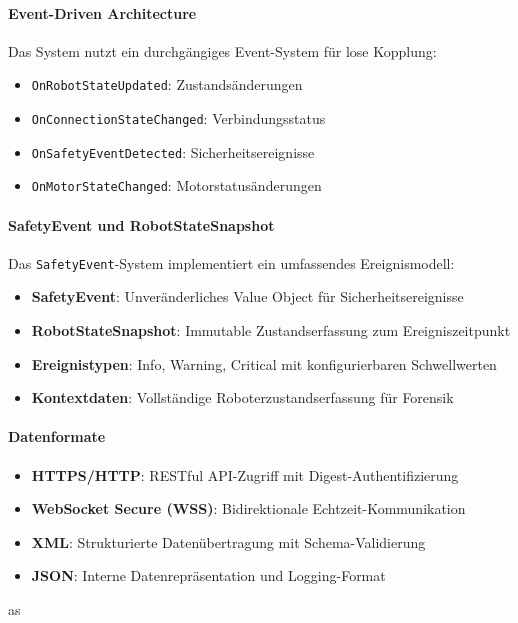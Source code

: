 
\paragraph{Event-Driven Architecture}
Das System nutzt ein durchgängiges Event-System für lose Kopplung:
\begin{itemize}
	\item \texttt{OnRobotStateUpdated}: Zustandsänderungen
	\item \texttt{OnConnectionStateChanged}: Verbindungsstatus
	\item \texttt{OnSafetyEventDetected}: Sicherheitsereignisse
	\item \texttt{OnMotorStateChanged}: Motorstatusänderungen
\end{itemize}

\paragraph{SafetyEvent und RobotStateSnapshot}
Das \texttt{SafetyEvent}-System implementiert ein umfassendes Ereignismodell:
\begin{itemize}
	\item \textbf{SafetyEvent}: Unveränderliches Value Object für Sicherheitsereignisse
	\item \textbf{RobotStateSnapshot}: Immutable Zustandserfassung zum Ereigniszeitpunkt
	\item \textbf{Ereignistypen}: Info, Warning, Critical mit konfigurierbaren Schwellwerten
	\item \textbf{Kontextdaten}: Vollständige Roboterzustandserfassung für Forensik
\end{itemize}

\paragraph{Datenformate}
\begin{itemize}
	\item \textbf{HTTPS/HTTP}: RESTful API-Zugriff mit Digest-Authentifizierung
	\item \textbf{WebSocket Secure (WSS)}: Bidirektionale Echtzeit-Kommunikation
	\item \textbf{XML}: Strukturierte Datenübertragung mit Schema-Validierung
	\item \textbf{JSON}: Interne Datenrepräsentation und Logging-Format
\end{itemize}

as
